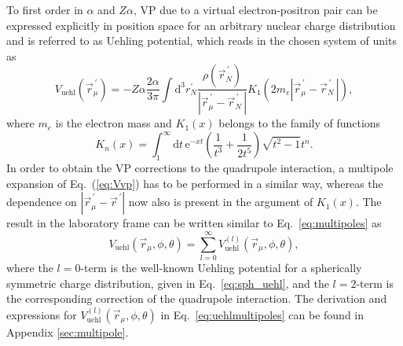 To first order  in $\alpha$ and $Z\alpha$, VP due to a virtual electron-positron pair can be expressed explicitly in position space for an arbitrary nuclear charge distribution and is referred to as Uehling potential, which reads in the chosen system of units as~\cite{Fullerton1976}
\begin{equation}
{V_{\text{uehl}}(\vec{r}_\mu^{\,\prime})}{=}{-Z\alpha\frac{2 \alpha}{3\pi} \int \text{d}^3r_N^{\prime} \frac{\rho(\vec{r}_N^{\,\prime})}{|\vec{r}_\mu^{\,\prime} - \vec{r}_N^{\,\prime}\,|} K_1(2m_e{|\vec{r}_\mu^{\,\prime} - \vec{r}_N^{\,\prime}\,|}),}
\label{eq:Vvp}
\end{equation}
where $m_e$ is the electron mass and $K_1(x)$ belongs to the family of functions
\begin{equation}
K_n(x)=\int_1^\infty \text{d}t\,\text{e}^{-xt}\left(\frac{1}{t^3}+\frac{1}{2t^5}\right)\sqrt{t^2-1}t^n.
\label{eq:defKn}
\end{equation}
In order to obtain the VP corrections to the quadrupole interaction, a multipole expansion of Eq.~(\ref{eq:Vvp}) has to be performed in a similar way, whereas the dependence on $|\vec{r}_\mu^{\,\prime}-\vec{r}^{\,\prime}|$ now also is present in the argument of $K_1(x)$. The result in the laboratory frame can be written similar to Eq.~\eqref{eq:multipoles} as
\begin{equation}
V_{\text{uehl}}(\vec{r}_\mu,\phi,\theta) = \sum_{l=0}^\infty V^{(l)}_{\text{uehl}}(\vec{r}_\mu,\phi,\theta),
\label{eq:uehlmultipoles}
\end{equation}
where the ${l}{=}{0}$-term is the well-known Uehling potential for a spherically symmetric charge distribution, given in Eq.~\eqref{eq:sph_uehl}, and the ${l}{=}{2}$-term is the corresponding correction of the quadrupole interaction. The derivation and expressions for $V^{(l)}_{\text{uehl}}(\vec{r}_\mu,\phi,\theta)$ in Eq.~\eqref{eq:uehlmultipoles} can be found in Appendix \ref{sec:multipole}.
%
%
